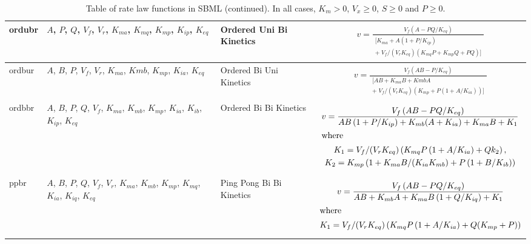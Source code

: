 \documentclass[10pt]{cekarticle}
\begin{document}
\begin{table}[ht]
\begin{tabular}{|p{0.45in}|>{\raggedright}m{0.77in}|>{\raggedright}m{1.2in}|m{3.46in}|}
ordubr & $A$, $P$, $Q$, $V_f$, $V_r$, $K_{ma}$, $K_{mq}$, $K_{mp}$, $K_{ip}$,
$K_{eq}$ & Ordered Uni Bi Kinetics &
\begin{gather*}
v = \frac{V_f \left( A - P Q/K_{eq}\right)}{\begin{split}
\biggl[ K_{ma} + A \left( 1 + P/K_{ip}\right) \\
+\; V_f/(V_r K_{eq})
\left( K_{mq} P + K_{mp} Q + P Q\right) \biggr]
\end{split}}
\end{gather*}
\\ \hline

ordbur & $A$, $B$, $P$, $V_f$, $V_r$, $K_{ma}$, $Kmb$, $K_{mp}$, $K_{ia}$,
$K_{eq}$ & Ordered Bi Uni Kinetics &
\begin{gather*}
v = \frac{V_f \left( A B -
P/K_{eq}\right)}{\begin{split}
\biggl[ A B + K_{ma} B + Kmb A \\
+\; V_f/(V_r K_{eq}) \left( K_{mp} + P
\left( 1 + A/K_{ia}\right) \right) \biggr]
\end{split}}
\end{gather*}
\\ \hline

ordbbr & $A$, $B$, $P$, $Q$, $V_f$, $K_{ma}$, $K_{mb}$, $K_{mp}$, $K_{ia}$,
$K_{ib}$, $K_{ip}$, $K_{eq}$ & Ordered Bi Bi Kinetics &
\begin{gather*}
v = \frac{V_f
\left( A B - P Q/K_{eq}\right) }{A B \left( 1 + P/K_{ip}\right) + K_{mb}
(A + K_{ia}) + K_{ma} B + K_1} \\
\intertext{where}
K_1 = V_f / (V_r K_{eq}) \left( K_{mq} P \left( 1 + A/K_{ia}\right) + Q k_2 \right) ,\\
K_2 = K_{mp} \left( 1 + K_{ma} B /(K_{ia} K_{mb}) + P \left( 1 + B/K_{ib} \right) \right)
\end{gather*}
\\ \hline

ppbr & $A$, $B$, $P$, $Q$, $V_f$, $V_r$, $K_{ma}$, $K_{mb}$, $K_{mp}$, $K_{mq}$,
$K_{ia}$, $K_{iq}$, $K_{eq}$ & Ping Pong Bi Bi Kinetics &
\begin{gather*}
v = \frac{V_f
\left( A B - P Q /K_{eq} \right) }{A B + K_{mb} A + K_{ma} B \left( 1 +
  Q/K_{iq}\right)+ K_1 } \\
\intertext{where}
K_1 = V_f/(V_r K_{eq})
\left( K_{mq} P \left( 1 + A/K_{ia} \right) + Q (K_{mp} + P) \right)
\end{gather*}
\\ \hline

\end{tabular}
\caption{Table of rate law functions in SBML (continued).  In all cases, $K_m > 0$, $V_x \geq 0$, $S
  \geq 0$ and $P \geq 0$.}
\end{table}
\end{document}
